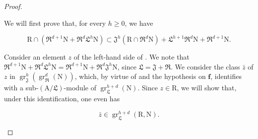 \begin{proof}
\begin{env}[19.7.1.18]
We will first prove that, for every $h\geqslant 0$, we have
\end{env}
\begin{env}[19.7.1.19]
\label{IV.19.7.1.19}
\[
  \mathrm{R}\cap(\mathfrak{R}^{d+1}\mathrm{N}+\mathfrak{R}^d\mathfrak{L}^h\mathrm{N})\subset\mathfrak{J}^h(\mathrm{R}\cap\mathfrak{R}^d\mathrm{N})+\mathfrak{L}^{h+1}\mathfrak{R}^d\mathrm{N}+\mathfrak{R}^{d+1}\mathrm{N}.
\]
\end{env}

Consider an element $z$ of the left-hand side of . We note that $\mathfrak{R}^{d+1}\mathrm{N}+\mathfrak{R}^d\mathfrak{L}^h\mathrm{N}=\mathfrak{R}^{d+1}\mathrm{N}+\mathfrak{R}^d\mathfrak{J}^h\mathrm{N}$, since $\mathfrak{L}=\mathfrak{J}+\mathfrak{R}$. We consider the class $\bar{z}$ of $z$ in $\operatorname{gr}_\mathfrak{J}^{h}(\operatorname{gr}_\mathfrak{R}^{d}(\mathrm{N}))$, which, by virtue of  and the hypothesis on $\mathbf{f}$, identifies with a sub-$(\mathrm{A}/\mathfrak{L})$-module of $\operatorname{gr}_\mathfrak{L}^{h+d}(\mathrm{N})$. Since $z\in\mathrm{R}$, we will show that, under this identification, one even has

\begin{env}[19.7.1.20]
\label{IV.19.7.1.20}
\[
  \bar{z}\in\operatorname{gr}_\mathfrak{L}^{h+d}(\mathrm{R},\mathrm{N}).
\]
\end{env}


\end{proof}
